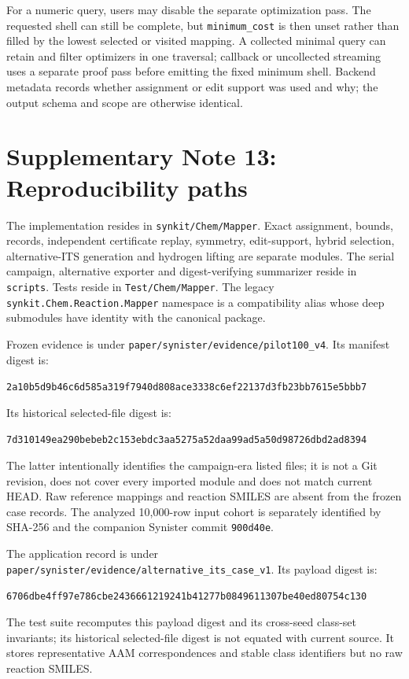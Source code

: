 \documentclass[11pt]{article}
\theoremstyle{definition}
\begin{document}
For a numeric query, users may disable the separate optimization pass.  The
requested shell can still be complete, but \texttt{minimum\_cost} is then
unset rather than filled by the lowest selected or visited mapping.  A
collected minimal query can retain and filter optimizers in one traversal;
callback or uncollected streaming uses a separate proof pass before emitting
the fixed minimum shell.  Backend metadata records whether assignment or edit support was used and why;
the output schema and scope are otherwise identical.

\section{Supplementary Note 13: Reproducibility paths}

The implementation resides in
\texttt{synkit/Chem/Mapper}.  Exact assignment, bounds, records, independent
certificate replay, symmetry, edit-support, hybrid selection, alternative-ITS
generation and hydrogen lifting are separate modules.  The serial campaign,
alternative exporter and digest-verifying summarizer reside in \texttt{scripts}.
Tests reside in
\texttt{Test/Chem/Mapper}.  The legacy
\texttt{synkit.Chem.Reaction.Mapper} namespace is a compatibility alias whose
deep submodules have identity with the canonical package.

Frozen evidence is under
\texttt{paper/synister/evidence/pilot100\_v4}.  Its manifest digest is:
\begin{center}\small
\texttt{2a10b5d9b46c6d585a319f7940d808ace3338c6ef22137d3fb23bb7615e5bbb7}
\end{center}
Its historical selected-file digest is:
\begin{center}\small
\texttt{7d310149ea290bebeb2c153ebdc3aa5275a52daa99ad5a50d98726dbd2ad8394}
\end{center}
The latter intentionally identifies the campaign-era listed files; it is not a
Git revision, does not cover every imported module and does not match current
HEAD.  Raw reference mappings and reaction SMILES are absent from the frozen
case records.  The analyzed 10,000-row input cohort is separately identified
by SHA-256 and the companion Synister commit \texttt{900d40e}.

The application record is under
\texttt{paper/synister/evidence/alternative\_its\_case\_v1}.  Its payload digest
is:
\begin{center}\small
\texttt{6706dbe4ff97e786cbe2436661219241b41277b0849611307be40ed80754c130}
\end{center}
The test suite recomputes this payload digest and its cross-seed class-set
invariants; its historical selected-file digest is not equated with current
source.  It stores representative AAM correspondences and stable class
identifiers but no raw reaction SMILES.
\end{document}
